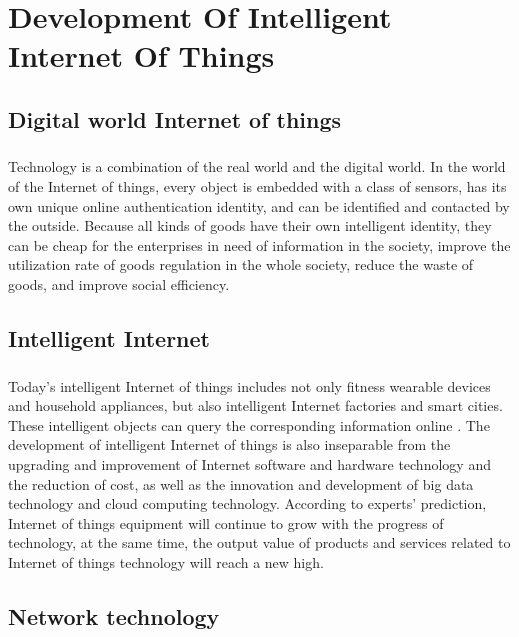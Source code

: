 \documentclass[12pt]{report}
\begin{document}
\

\chapter{Development Of Intelligent Internet Of Things}
\section{Digital world Internet of things}
\paragraph{} Technology is a combination of the real world and the digital world. In the world of
the Internet of things, every object is embedded with a class of sensors, has its own unique
online authentication identity, and can be identified and contacted by the outside. Because
all kinds of goods have their own intelligent identity, they can be cheap for the enterprises
in need of information in the society, improve the utilization rate of goods regulation in the
whole society, reduce the waste of goods, and improve social efficiency.

\section{ Intelligent Internet}
\paragraph{}
Today’s intelligent Internet of things includes not only fitness wearable devices and
household appliances, but also intelligent Internet factories and smart cities. These
intelligent objects can query the corresponding information online . The development of
intelligent Internet of things is also inseparable from the upgrading and improvement of
Internet software and hardware technology and the reduction of cost, as well as the
innovation and development of big data technology and cloud computing technology.
According to experts’ prediction, Internet of things equipment will continue to grow with
the progress of technology, at the same time, the output value of products and services
related to Internet of things technology will reach a new high.
\section{ Network technology}
\end{document}
